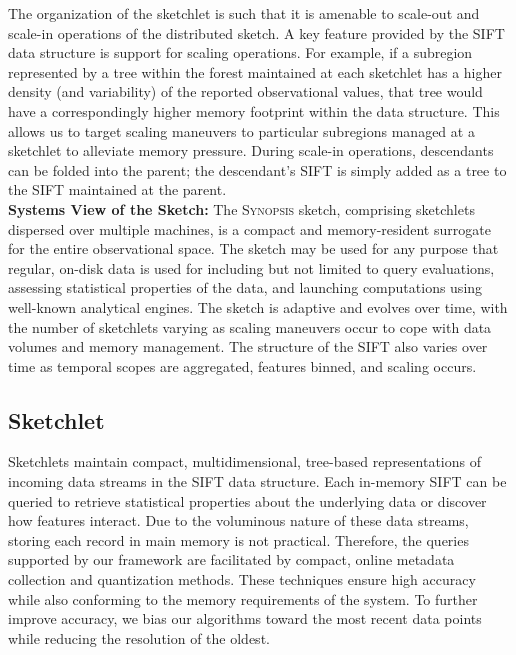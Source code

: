\documentclass[9pt,journal,compsoc]{IEEEtran}
\begin{document}
The organization of the sketchlet is such that it is amenable to scale-out and scale-in operations of the distributed sketch. A key feature provided by the SIFT data structure is support for scaling operations. For example, if a subregion represented by a tree within the forest maintained at each sketchlet has a higher density (and variability) of the reported observational values, that tree would have a correspondingly higher memory footprint within the data structure. This allows us to target scaling maneuvers to particular subregions managed at a sketchlet to alleviate memory pressure.  During scale-in operations, descendants can be folded into the parent; the descendant's SIFT is simply added as a tree to the SIFT maintained at the parent.
%
\vspace{0.7em}\\
%
\textbf{Systems View of the Sketch:} The \textsc{Synopsis} sketch, comprising sketchlets dispersed over multiple machines, is a compact and memory-resident surrogate for the entire observational space. The sketch may be used for any purpose that regular, on-disk data is used for including but not limited to query evaluations, assessing statistical properties of the data, and launching computations using well-known analytical engines. The sketch is adaptive and evolves over time, with the number of sketchlets varying as scaling maneuvers occur to cope with data volumes and memory management. The structure of the SIFT also varies over time as temporal scopes are aggregated, features binned, and scaling occurs.

\subsection{Sketchlet}
\label{sec:sketch}
Sketchlets maintain compact, multidimensional, tree-based representations of incoming data streams in the SIFT data structure. Each in-memory SIFT can be queried to retrieve statistical properties about the underlying data or discover how features interact. Due to the voluminous nature of these data streams, storing each record in main memory is not practical. Therefore, the queries supported by our framework are facilitated by compact, online metadata collection and quantization methods. These techniques ensure high accuracy while also conforming to the memory requirements of the system. To further improve accuracy, we bias our algorithms toward the most recent data points while reducing the resolution of the oldest.
\end{document}
